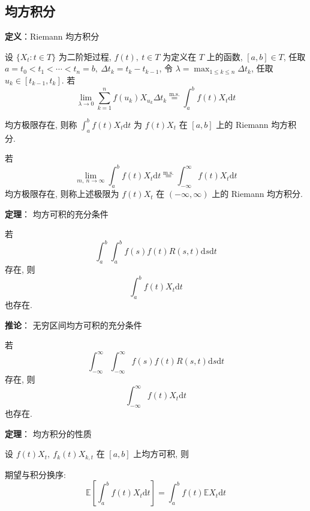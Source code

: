 \documentclass[openany]{ctexbook}
\theoremstyle{kaiti}
\theoremstyle{normal}
\begin{document}
\subsection{均方积分}

\textbf{定义}：Riemann 均方积分

设 $\{X_t:t\in T\}$ 为二阶矩过程, $f(t),~t\in T$ 为定义在 $T$ 上的函数, $[a,b]\in T$, 任取 $a=t_0<t_1<\cdots <t_n=b,~\Delta t_k=t_k-t_{k-1}$, 令 $\lambda=\max_{1\leqslant k\leqslant n}\Delta t_k$, 任取 $u_k\in[t_{k-1},t_k]$. 若
\begin{equation}
  \lim_{\lambda\to0}\sum_{k=1}^nf(u_k)X_{u_k}\Delta t_k\overset{\mathrm{m.s.}}{=}\int_a^bf(t)X_t\mathrm{d}t
\end{equation}

均方极限存在, 则称 $\displaystyle\int_a^bf(t)X_t\mathrm{d}t$ 为 $f(t)X_t$ 在 $[a,b]$ 上的 Riemann 均方积分.

若
\begin{equation}
  \lim_{m,~n\to\infty}\int_a^bf(t)X_t\mathrm{d}t\overset{\mathrm{m.s.}}{=}\int_{-\infty}^\infty f(t)X_t\mathrm{d}t
\end{equation}
均方极限存在, 则称上述极限为 $f(t)X_t$ 在 $(-\infty,\infty)$ 上的 Riemann 均方积分.

\textbf{定理}： 均方可积的充分条件

若
\begin{equation}
  \int_a^b\int_a^bf(s)f(t)R(s,t)\mathrm{d}s\mathrm{d}t
\end{equation}
存在, 则
\begin{equation}
  \int_a^bf(t)X_t\mathrm{d}t
\end{equation}
也存在.

\textbf{推论}： 无穷区间均方可积的充分条件

若
\begin{equation}
  \int_{-\infty}^\infty\int_{-\infty}^\infty f(s)f(t)R(s,t)\mathrm{d}s\mathrm{d}t
\end{equation}
存在, 则
\begin{equation}
  \int_{-\infty}^\infty f(t)X_t\mathrm{d}t
\end{equation}
也存在.

\textbf{定理}： 均方积分的性质

设 $f(t)X_t,~f_k(t)X_{k,t}$ 在 $[a,b]$ 上均方可积, 则

期望与积分换序:
\begin{equation}
  \mathbb{E}\left[\int_a^bf(t)X_t\mathrm{d}t\right]=\int_a^bf(t)\mathbb{E}X_t\mathrm{d}t
\end{equation}
\end{document}
